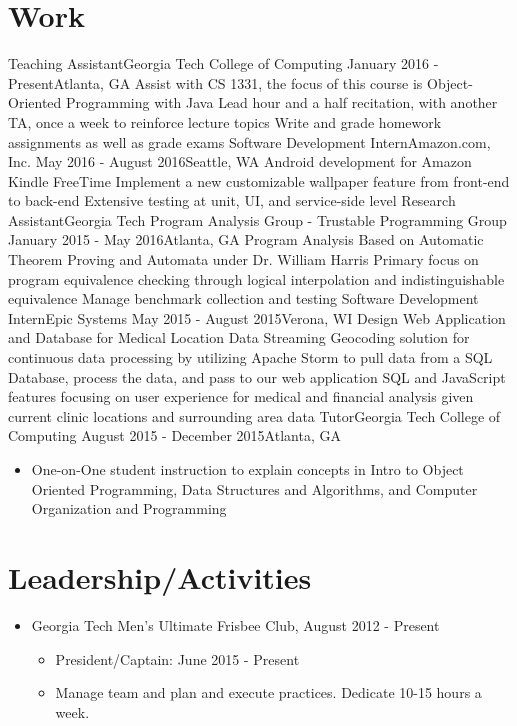 \documentclass{resume_template}
\begin{document}
	\section{Work}
		\noindent\workinfo
			{Teaching Assistant}{Georgia Tech College of Computing}
			{January 2016 - Present}{Atlanta, GA}
		\workitems
			{Assist with CS 1331, the focus of this course is Object-Oriented Programming with Java}
			{Lead hour and a half recitation, with another TA, once a week to reinforce lecture topics}
			{Write and grade homework assignments as well as grade exams}
		\workinfo
			{Software Development Intern}{Amazon.com, Inc.}
			{May 2016 - August 2016}{Seattle, WA}
    	\workitems
		{Android development for Amazon Kindle FreeTime}
		{Implement a new customizable wallpaper feature from front-end to back-end}
		{Extensive testing at unit, UI, and service-side level}
		\workinfo
		{Research Assistant}{Georgia Tech Program Analysis Group - Trustable Programming Group}
		{January 2015 - May 2016}{Atlanta, GA}
		\workitems
		{Program Analysis Based on Automatic Theorem Proving and Automata under Dr. William Harris}
		{Primary focus on program equivalence checking through logical interpolation and indistinguishable equivalence}
		{Manage benchmark collection and testing}
		\workinfo
			{Software Development Intern}{Epic Systems}
			{May 2015 - August 2015}{Verona, WI}
		\workitems
			{Design Web Application and Database for Medical Location Data}
			{Streaming Geocoding solution for continuous data processing by utilizing Apache Storm to pull data from a SQL
				Database, process the data, and pass to our web application}
			{SQL and JavaScript features focusing on user experience for medical and financial analysis given current clinic
				locations and surrounding area data}
		\workinfo
			{Tutor}{Georgia Tech College of Computing}
			{August 2015 - December 2015}{Atlanta, GA}
		\begin{itemize}[leftmargin=0.4cm]
		\item One-on-One student instruction to explain concepts in Intro to Object Oriented Programming, Data Structures and
			Algorithms, and Computer Organization and Programming	
		\end{itemize}
	\section{Leadership/Activities}
		
	\begin{itemize}[nosep, leftmargin=0.4cm]
	\item Georgia Tech Men's Ultimate Frisbee Club, August 2012 - Present
		\begin{itemize}[nosep]
		\item[] President/Captain: June 2015 - Present
		\item[] Manage team and plan and execute practices. Dedicate 10-15 hours a week.
		\end{itemize}
	\end{itemize}
\end{document}
